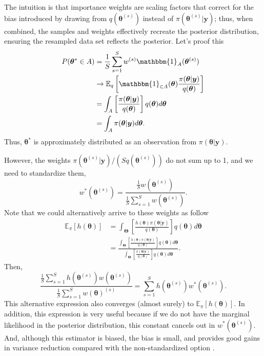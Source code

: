 The intuition is that importance weights are scaling factors that correct for the bias introduced by drawing from $q(\bm{\theta}^{(s)})$ instead of $\pi(\bm{\theta}^{(s)}|\bm{y})$; thus, when combined, the samples and weights effectively recreate the posterior distribution, ensuring the resampled data set reflects the posterior. Let's proof this 
\begin{align*}
	P(\bm{\theta}^*\in A)
	&=\frac{1}{S}\sum_{s=1}^S{w}^{(s)}\mathbbm{1}_{A}(\bm{\theta}^{(s)})\\
	&\rightarrow \mathbb{E}_q\left[\mathbbm{1}_{\in A}(\bm{\theta})\frac{\pi(\bm{\theta}|\bm{y})}{q(\bm{\theta})}\right]\\
	&=\int_{A}\left[\frac{\pi(\bm{\theta}|\bm{y})}{q(\bm{\theta})}\right]q(\bm{\theta})d\bm{\theta}\\
	&=\int_{A}\pi(\bm{\theta}|\bm{y})d\bm{\theta}. 
\end{align*}
Thus, $\bm{\theta}^*$ is approximately distributed as an observation from $\pi(\bm{\theta}|\bm{y})$.   


However, the weights $\pi(\bm{\theta}^{(s)}|\bm{y})/(Sq(\bm{\theta}^{(s)}))$ do not sum up to 1, and we need to standardize them, 
$$w^*(\bm{\theta}^{(s)})=\frac{\frac{1}{S} w(\bm{\theta}^{(s)})}{\frac{1}{S}\sum_{s=1}^Sw(\bm{\theta}^{(s)})}.$$
Note that we could alternatively arrive to these weights as follow 
\begin{align*}\label{eq5_4}
	\mathbb{E}_{\pi}[h(\bm{\theta})]&=\int_{\bm{\Theta}} \left[\frac{h(\bm{\theta}) \pi(\bm{\theta}|\bm{y})}{q(\bm{\theta})}\right]q(\bm{\theta})d\bm{\theta}\\
	&=\frac{\int_{\bm{\Theta}}\left[\frac{h(\bm{\theta}) \pi(\bm{\theta}|\bm{y})}{q(\bm{\theta})}\right] q(\bm{\theta})d\bm{\theta}}{\int_{\bm{\Theta}}\left[\frac{ \pi(\bm{\theta}|\bm{y})}{q(\bm{\theta})}\right] q(\bm{\theta})d\bm{\theta}}.
\end{align*}
Then, $$\frac{\frac{1}{S}\sum_{s=1}^Sh(\bm{\theta}^{(s)})w(\bm{\theta}^{(s)})}{\frac{1}{S}\sum_{s=1}^Sw(\bm{\theta})^{(s)}}= \sum_{s=1}^S h(\bm{\theta}^{(s)})w^*(\bm{\theta}^{(s)}).$$ This alternative expression also converges (almost surely) to $\mathbb{E}_{\pi}[h(\bm{\theta})]$.  In addition, this expression is very useful because if we do not have the marginal likelihood in the posterior distribution, this constant cancels out in $w^*(\bm{\theta}^{(s)})$. And, although this estimator is biased, the bias is small, and provides good gains in variance reduction compared with the non-standardized option \cite[Chap.~3]{robert2011monte}.

